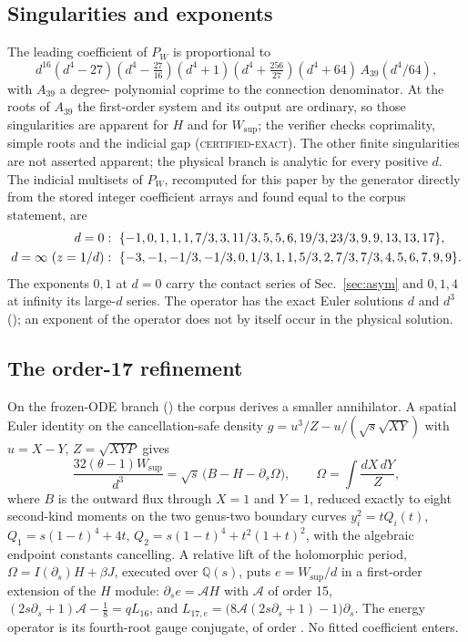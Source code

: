 \documentclass[aps,prd,onecolumn,amsmath,amssymb,longbibliography,floatfix,nofootinbib]{revtex4-2}
\newcommand{\Wsup}{W_{\mathrm{sup}}}
\newcommand{\st}[1]{\textsc{#1}}
\begin{document}
\subsection{Singularities and exponents}
The leading coefficient of $P_W$ is proportional to
\begin{equation}
d^{16}(d^4-27)(d^4-\tfrac{27}{16})(d^4+1)(d^4+\tfrac{256}{27})(d^4+64)\,A_{39}(d^4/64),
\end{equation}
with $A_{39}$ a degree-\ApparentDegVal{} polynomial coprime to the connection denominator. At the roots of $A_{39}$ the first-order system and its output are ordinary, so those singularities are apparent for $H$ and for $\Wsup$; the verifier checks coprimality, simple roots and the indicial gap (\st{certified-exact}). The other finite singularities are not asserted apparent; the physical branch is analytic for every positive $d$. The indicial multisets of $P_W$, recomputed for this paper by the generator directly from the stored integer coefficient arrays and found equal to the corpus statement, are
\begin{align}
d=0&:\ \{-1,0,1,1,1,7/3,3,11/3,5,5,6,19/3,23/3,9,9,13,13,17\},\nonumber\\
d=\infty\ (z=1/d)&:\ \{-3,-1,-1/3,-1/3,0,1/3,1,1,5/3,2,7/3,7/3,4,5,6,7,9,9\} .
\end{align}
The exponents $0,1$ at $d=0$ carry the contact series of Sec.~\ref{sec:asym} and $0,1,4$ at infinity its large-$d$ series. The operator has the exact Euler solutions $d$ and $d^3$ (); an exponent of the operator does not by itself occur in the physical solution.

\subsection{The order-17 refinement}
\label{sec:order17}
On the frozen-ODE branch (\RefOde) the corpus derives a smaller annihilator. A spatial Euler identity on the cancellation-safe density $g=u^3/Z-u/(\sqrt{s}\sqrt{XY})$ with $u=X-Y$, $Z=\sqrt{XYP}$ gives
\begin{equation}
\frac{32(\theta-1)\Wsup}{d^3}=\sqrt{s}\,\bigl(B-H-\partial_s\Omega\bigr),\qquad \Omega=\int\frac{dX\,dY}{Z},
\end{equation}
where $B$ is the outward flux through $X=1$ and $Y=1$, reduced exactly to eight second-kind moments on the two genus-two boundary curves $y_i^2=tQ_i(t)$, $Q_1=s(1-t)^4+4t$, $Q_2=s(1-t)^4+t^2(1+t)^2$, with the algebraic endpoint constants cancelling. A relative lift of the holomorphic period, $\Omega=I(\partial_s)H+\beta J$, executed over $\mathbb{Q}(s)$, puts $e=\Wsup/d$ in a first-order extension of the $H$ module: $\partial_s e=\mathcal{A}H$ with $\mathcal{A}$ of order 15, $(2s\partial_s+1)\mathcal{A}-\tfrac18=qL_{16}$, and $L_{17,e}=\bigl(8\mathcal{A}(2s\partial_s+1)-1\bigr)\partial_s$. The energy operator is its fourth-root gauge conjugate, of order \OrderSeventeenVal{}. No fitted coefficient enters.
\end{document}
